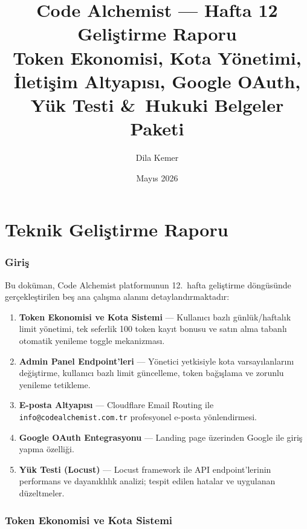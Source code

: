 \documentclass[12pt,a4paper]{article}
\title{%
  \textbf{Code Alchemist --- Hafta 12 Geli\c{s}tirme Raporu} \\[0.3em]
  \large Token Ekonomisi, Kota Y\"{o}netimi, \.{I}leti\c{s}im Altyap{\i}s{\i},
         Google OAuth, Y\"{u}k Testi \&\ Hukuki Belgeler Paketi%
}
\author{Dila Kemer}
\date{May{\i}s 2026}
\begin{document}
\maketitle
\tableofcontents
\newpage

\part{Teknik Geli\c{s}tirme Raporu}

\section{Giri\c{s}}
Bu dok\"{u}man, Code Alchemist platformunun 12.\ hafta geli\c{s}tirme d\"{o}ng\"{u}s\"{u}nde ger\c{c}ekle\c{s}tirilen be\c{s} ana
\c{c}al{\i}\c{s}ma alan{\i}n{\i} detayland{\i}rmaktad{\i}r:

\begin{enumerate}
  \item \textbf{Token Ekonomisi ve Kota Sistemi} --- Kullan{\i}c{\i} bazl{\i} g\"{u}nl\"{u}k/haftal{\i}k limit y\"{o}netimi,
        tek seferlik 100 token kay{\i}t bonusu ve sat{\i}n alma tabanl{\i} otomatik yenileme toggle mekanizmas{\i}.
  \item \textbf{Admin Panel Endpoint'leri} --- Y\"{o}netici yetkisiyle kota varsay{\i}lanlar{\i}n{\i} de\u{g}i\c{s}tirme,
        kullan{\i}c{\i} bazl{\i} limit g\"{u}ncelleme, token ba\u{g}{\i}\c{s}lama ve zorunlu yenileme tetikleme.
  \item \textbf{E-posta Altyap{\i}s{\i}} --- Cloudflare Email Routing ile \texttt{info@codealchemist.com.tr}
        profesyonel e-posta y\"{o}nlendirmesi.
  \item \textbf{Google OAuth Entegrasyonu} --- Landing page \"{u}zerinden Google ile giri\c{s} yapma \"{o}zelli\u{g}i.
  \item \textbf{Y\"{u}k Testi (Locust)} --- Locust framework ile API endpoint'lerinin performans ve dayan{\i}kl{\i}l{\i}k
        analizi; tespit edilen hatalar ve uygulanan d\"{u}zeltmeler.
\end{enumerate}

\section{Token Ekonomisi ve Kota Sistemi}
\end{document}
